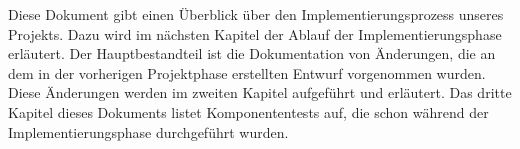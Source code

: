Diese Dokument gibt einen Überblick über den Implementierungsprozess unseres Projekts. Dazu wird im nächsten Kapitel der Ablauf der Implementierungsphase erläutert. Der Hauptbestandteil ist die Dokumentation von Änderungen, die an dem in der vorherigen Projektphase erstellten Entwurf vorgenommen wurden.
Diese Änderungen werden im zweiten Kapitel aufgeführt und erläutert.
Das dritte Kapitel dieses Dokuments listet Komponententests auf, die schon während der Implementierungsphase durchgeführt wurden.